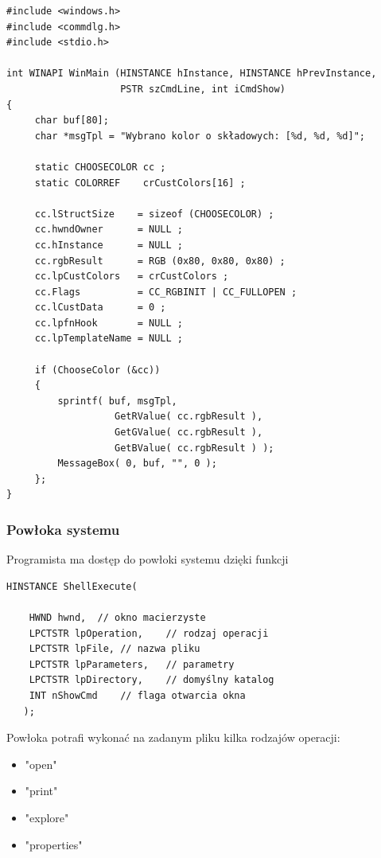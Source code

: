 \begin{scriptsize}
\begin{verbatim}
#include <windows.h>
#include <commdlg.h>
#include <stdio.h>

int WINAPI WinMain (HINSTANCE hInstance, HINSTANCE hPrevInstance,
                    PSTR szCmdLine, int iCmdShow)
{
     char buf[80];
     char *msgTpl = "Wybrano kolor o składowych: [%d, %d, %d]";

     static CHOOSECOLOR cc ;
     static COLORREF    crCustColors[16] ;

     cc.lStructSize    = sizeof (CHOOSECOLOR) ;
     cc.hwndOwner      = NULL ;
     cc.hInstance      = NULL ;
     cc.rgbResult      = RGB (0x80, 0x80, 0x80) ;
     cc.lpCustColors   = crCustColors ;
     cc.Flags          = CC_RGBINIT | CC_FULLOPEN ;
     cc.lCustData      = 0 ;
     cc.lpfnHook       = NULL ;
     cc.lpTemplateName = NULL ;

     if (ChooseColor (&cc))
     {
         sprintf( buf, msgTpl, 
                   GetRValue( cc.rgbResult ),
                   GetGValue( cc.rgbResult ),
                   GetBValue( cc.rgbResult ) );
         MessageBox( 0, buf, "", 0 );
     };
}
\end{verbatim}
\end{scriptsize}

\subsubsection{Powłoka systemu}
\label{powlokaSystemu}

Programista ma dostęp do powłoki systemu dzięki funkcji

\begin{scriptsize}
\begin{verbatim}
HINSTANCE ShellExecute(

    HWND hwnd,	// okno macierzyste
    LPCTSTR lpOperation,	// rodzaj operacji
    LPCTSTR lpFile,	// nazwa pliku
    LPCTSTR lpParameters,	// parametry
    LPCTSTR lpDirectory,	// domyślny katalog
    INT nShowCmd 	// flaga otwarcia okna
   );
\end{verbatim}
\end{scriptsize}

Powłoka potrafi wykonać na zadanym pliku kilka rodzajów operacji:
\begin{itemize}
\item "open"
\item "print"
\item "explore"
\item "properties"
\end{itemize}

